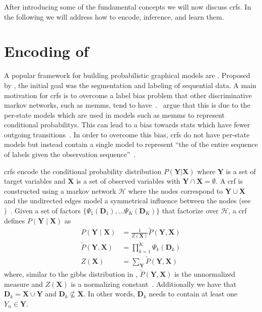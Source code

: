\bigskip

After introducing some of the fundamental concepts we will now discuss \glspl{crf}. In the following we will address how to encode, inference, and learn them.

\section{Encoding of }\label{sec:definition-crfs}
A popular framework for building \glspl{probabilistic graphical model} are .
Proposed by \citet{lafferty2001conditional}, the initial goal was the segmentation and labeling of sequential data.
A main motivation for \glspl{crf} is to overcome a label bias problem that other discriminative \glspl{markov network}, such as \glspl{memm}, tend to have~\citep{lafferty2001conditional}.\
\citet{lafferty2001conditional} argue that this is due to the per-state models which are used in models such as \glspl{memm} to represent \glspl{conditional probability}.
This can lead to a bias towards stats which have fewer outgoing transitions~\citep{lafferty2001conditional}.
In order to overcome this bias, \glspl{crf} do not have per-state models but instead contain a single model to represent ``the  of the entire sequence of labels given the observation sequence''~\citep{lafferty2001conditional}.

\bigskip

\Glspl{crf} encode the \gls{conditional probability distribution} $P(\mathbf{Y}|\mathbf{X})$ where $\mathbf{Y}$ is a set of \glspl{target variable} and $\mathbf{X}$ is a set of \glspl{observed variable} with $\mathbf{Y}\cap\mathbf{X}=\emptyset$.
A \gls{crf} is constructed using a \gls{markov network} $\mathcal{H}$ where the nodes correspond to $\mathbf{Y}\cup\mathbf{X}$ and the undirected edges model a symmetrical influence between the nodes (see \Cref{subsec:graphical-models})~\citep{koller2009probabilistic}.
Given a set of \glspl{factor} $\{\Psi_1(\mathbf{D}_1),\dots\Psi_K(\mathbf{D}_K)\}$ that factorize over $\mathcal{H}$, a \gls{crf} defines $P(\mathbf{Y}\mid\mathbf{X})$ as~\citep{koller2009probabilistic}
\begin{equation}
  \label{equ:crf-factor}
  \begin{split}
    P(\mathbf{Y}\mid\mathbf{X}) & = \frac{1}{Z(\mathbf{X})}\tilde{P}(\mathbf{Y},\mathbf{X}) \\
    \tilde{P}(\mathbf{Y},\mathbf{X}) &= \prod_{k=1}^{K}\Psi_k\left(\mathbf{D}_k\right) \\
    Z(\mathbf{X}) & = \sum_{\mathbf{Y}}\tilde{P}(\mathbf{Y},\mathbf{X})
  \end{split}
\end{equation}
where, similar to the \gls{gibbs distribution} in , $\tilde{P}(\mathbf{Y},\mathbf{X})$ is the unnormalized measure and $Z(\mathbf{X})$ is a normalizing constant~\citep{koller2009probabilistic}.
Additionally we have that $\mathbf{D}_k=\mathbf{X}\cup\mathbf{Y}$ and $\mathbf{D}_k\not\subseteq\mathbf{X}$.
In other words, $\mathbf{D}_k$ needs to contain at least one $Y_n\in \mathbf{Y}$.

